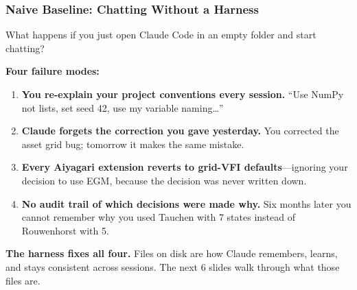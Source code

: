 \documentclass[10pt,english,aspectratio=169]{beamer}
\begin{document}
\begin{frame}
\frametitle{Naive Baseline: Chatting Without a Harness}

What happens if you just open Claude Code in an empty folder and start chatting?

\vspace{0.3cm}

\textbf{Four failure modes:}
\begin{enumerate}
    \item \textbf{You re-explain your project conventions every session.} ``Use NumPy not lists, set seed 42, use my variable naming\ldots''
    \vspace{0.1cm}
    \item \textbf{Claude forgets the correction you gave yesterday.} You corrected the asset grid bug; tomorrow it makes the same mistake.
    \vspace{0.1cm}
    \item \textbf{Every Aiyagari extension reverts to grid-VFI defaults}---ignoring your decision to use EGM, because the decision was never written down.
    \vspace{0.1cm}
    \item \textbf{No audit trail of which decisions were made why.} Six months later you cannot remember why you used Tauchen with 7 states instead of Rouwenhorst with 5.
\end{enumerate}

\vspace{0.3cm}

\textbf{The harness fixes all four.} Files on disk are how Claude remembers, learns, and stays consistent across sessions. The next 6 slides walk through what those files are.
\end{frame}
\end{document}
